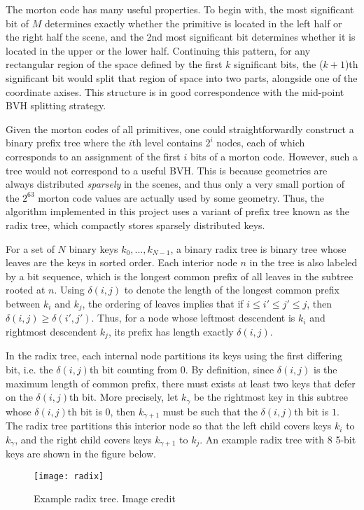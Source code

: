 \newpage
\thispagestyle{empty}
\enlargethispage{5\baselineskip}

The morton code has many useful properties. To begin with, the most significant bit of $M$ determines exactly whether the primitive is located in the left half or the right half the scene, and the 2nd most significant bit determines whether it is located in the upper or the lower half. Continuing this pattern, for any rectangular region of the space defined by the first $k$ significant bits, the ($k+1$)th significant bit would split that region of space into two parts, alongside one of the coordinate axises. This structure is in good correspondence with the mid-point BVH splitting strategy.


Given the morton codes of all primitives, one could straightforwardly construct a binary prefix tree where the $i$th level contains $2^i$ nodes, each of which corresponds to an assignment of the first $i$ bits of a morton code. However, such a tree would not correspond to a useful BVH. This is because geometries are always distributed \textit{sparsely} in the scenes, and thus only a very small portion of the $2^{63}$ morton code values are actually used by some geometry. Thus, the algorithm \cite{bvh_build} implemented in this project uses a variant of prefix tree known as the radix tree, which compactly stores sparsely distributed keys.

For a set of $N$ binary keys $k_0,...,k_{N-1}$, a binary radix tree is binary tree whose leaves are the keys in sorted order. Each interior node $n$ in the tree is also labeled by a bit sequence, which is the longest common prefix of all leaves in the subtree rooted at $n$. Using $\delta(i,j)$ to denote the length of the longest common prefix between $k_i$ and $k_j$, the ordering of leaves implies that if $i\leq i'\leq j'\leq j$, then $\delta(i,j)\geq \delta(i',j')$. Thus, for a node whose leftmost descendent is $k_i$ and rightmost descendent $k_j$, its prefix has length exactly $\delta(i,j)$. 


In the radix tree, each internal node partitions its keys using the first differing bit, i.e. the $\delta(i,j)$th bit counting from 0. By definition, since $\delta(i,j)$ is the maximum length of common prefix, there must exists at least two keys that defer on the $\delta(i,j)$th bit. More precisely, let $k_{\gamma}$ be the rightmost key in this subtree whose $\delta(i,j)$th bit is $0$, then $k_{\gamma+1}$ must be such that the $\delta(i,j)$th bit is $1$. The radix tree partitions this interior node so that the left child covers keys $k_i$ to $k_\gamma$, and the right child covers keys $k_{\gamma+1}$ to $k_{j}$. An example radix tree with 8 5-bit keys are shown in the figure below.
\begin{figure}[H]
    \centering
    \texttt{[image: radix]}
    \caption{Example radix tree. Image credit \cite{bvh_build}}
    \label{image radix tree}
\end{figure} 



